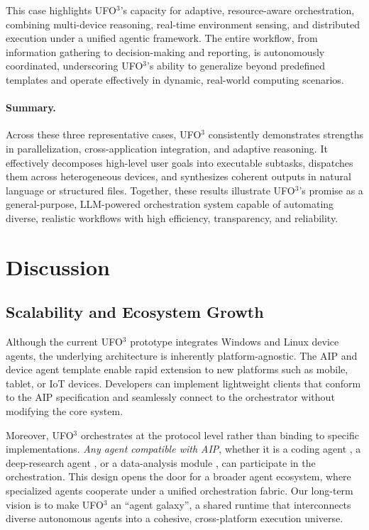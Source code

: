 \documentclass[10pt]{article} %
\newcommand{\ufo}{\textsc{UFO}$^3$\xspace}
\begin{document}
This case highlights \ufo's capacity for adaptive, resource-aware orchestration, combining multi-device reasoning, real-time environment sensing, and distributed execution under a unified agentic framework. The entire workflow, from information gathering to decision-making and reporting, is autonomously coordinated, underscoring \ufo's ability to generalize beyond predefined templates and operate effectively in dynamic, real-world computing scenarios.

\paragraph{Summary.} 
Across these three representative cases, \ufo consistently demonstrates strengths in parallelization, cross-application integration, and adaptive reasoning. It effectively decomposes high-level user goals into executable subtasks, dispatches them across heterogeneous devices, and synthesizes coherent outputs in natural language or structured files. Together, these results illustrate \ufo's promise as a general-purpose, LLM-powered orchestration system capable of automating diverse, realistic workflows with high efficiency, transparency, and reliability.




\section{Discussion}
\label{sec:discussion}

\subsection{Scalability and Ecosystem Growth}
Although the current \ufo prototype integrates Windows and Linux device agents, the underlying architecture is inherently platform-agnostic. The AIP and device agent template enable rapid extension to new platforms such as mobile, tablet, or IoT devices. Developers can implement lightweight clients that conform to the AIP specification and seamlessly connect to the orchestrator without modifying the core system.

Moreover, \ufo orchestrates at the protocol level rather than binding to specific implementations. \emph{Any agent compatible with AIP}, whether it is a coding agent \cite{yang2024swe}, a deep-research agent \cite{huang2025deep}, or a data-analysis module \cite{zhang2025allhands}, can participate in the orchestration. This design opens the door for a broader agent ecosystem, where specialized agents cooperate under a unified orchestration fabric. Our long-term vision is to make \ufo an ``agent galaxy'', a shared runtime that interconnects diverse autonomous agents into a cohesive, cross-platform execution universe.
\end{document}
